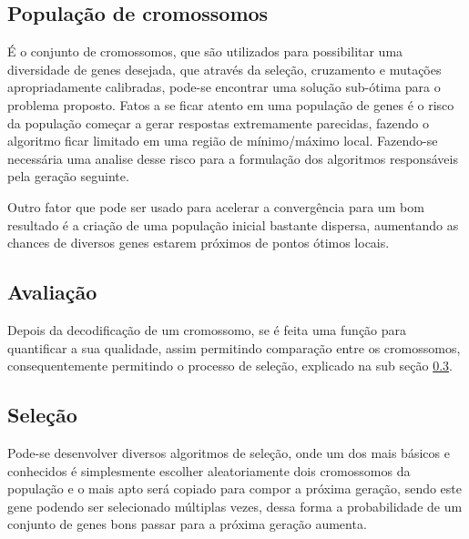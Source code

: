 \subsection{População de cromossomos}
É o conjunto de cromossomos, que são utilizados para possibilitar uma diversidade de genes desejada, que através da seleção, cruzamento e mutações apropriadamente calibradas, pode-se encontrar uma solução sub-ótima para o problema proposto.
\newline
Fatos a se ficar atento em uma população de genes é o risco da população começar a gerar respostas extremamente parecidas, fazendo o algoritmo ficar limitado em uma região de mínimo/máximo local. Fazendo-se necessária uma analise desse risco para a formulação dos algoritmos responsáveis pela geração seguinte.\newline

Outro fator que pode ser usado para acelerar a convergência para um bom resultado é a criação de uma população inicial bastante dispersa, aumentando as chances de diversos genes estarem próximos de pontos ótimos locais.\newline

\subsection{Avaliação}
Depois da decodificação de um cromossomo, se é feita uma função para quantificar a sua qualidade, assim permitindo comparação entre os cromossomos, consequentemente permitindo o processo de seleção, explicado na sub seção \ref{Cap_intro:sec_GA:sub_selection}.
\subsection{Seleção}\label{Cap_intro:sec_GA:sub_selection}
Pode-se desenvolver diversos algoritmos de seleção, onde um dos mais básicos e conhecidos é simplesmente escolher aleatoriamente dois cromossomos da população e o mais apto será copiado para compor a próxima geração, sendo este gene podendo ser selecionado múltiplas vezes, dessa forma a probabilidade de um conjunto de genes bons passar para a próxima geração aumenta.

